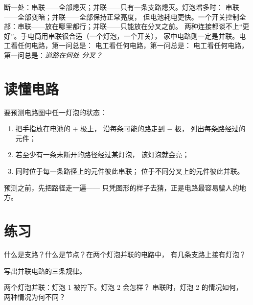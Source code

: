 \begin{remark}[串联与并联对比]\label{rem:g5:series-parallel-circuits:compare}
断一处：串联——全部熄灭；并联——只有一条支路熄灭。灯泡增多时：
串联——全部变暗；并联——全部保持正常亮度，
但电池耗电更快。一个开关控制全部：串联——放在哪里都行；并联——只能放在分叉之前。
两种连接都谈不上“更好”。手电筒用串联很合适（一个灯泡，一个开关），
家中电路则一定是并联。电工看任何电路，第一问总是：
电工看任何电路，第一问总是：
电工看任何电路，第一问总是：\emph{道路在何处
分叉？}
\end{remark}

\section{读懂电路}

\begin{method}[沿着路径走]\label{met:g5:series-parallel-circuits:follow}
要预测电路图中任一灯泡的状态：
\begin{enumerate}
  \item 把手指放在电池的 $+$ 极上，
        沿每条可能的路走到 $-$ 极，
        列出每条路经过的元件；
  \item 若至少有一条未断开的路径经过某灯泡，
        该灯泡就会亮；
  \item 同时位于每一条路径上的元件彼此串联；
        位于不同分叉上的元件彼此并联。
\end{enumerate}
预测之前，先把路径走一遍——
只凭图形的样子去猜，正是电路最容易骗人的地方。
\end{method}

\section{练习}

\begin{exercise}[$\star$]\label{exo:g5:series-parallel-circuits:1}
什么是支路？什么是节点？在两个灯泡并联的电路中，
有几条支路上接有灯泡？
\end{exercise}

\begin{exercise}[$\star$]\label{exo:g5:series-parallel-circuits:2}
写出并联电路的三条规律。
\end{exercise}

\begin{exercise}[$\star$]\label{exo:g5:series-parallel-circuits:3}
两个灯泡并联：灯泡 1 被拧下。灯泡 2 会怎样？
串联时，灯泡 2 的情况如何，
两种情况为何不同？
\end{exercise}

